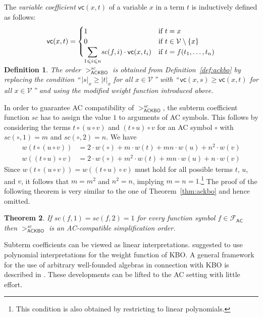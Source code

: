 \documentclass{tlp}
\newcommand{\qed}{\hspace*{1em}\hbox{\proofbox}}
\newtheorem{theorem}{Theorem}[section]
\newtheorem{definition}[theorem]{Definition}
\newcommand{\m}[1]{\mathsf{#1}}
\newcommand{\mc}[1]{\mathcal{#1}}
\newcommand{\mr}[1]{\mathrm{#1}}
\newcommand{\FF}{\mc{F}}
\newcommand{\VV}{\mc{V}}
\newcommand{\AC}{\mr{\m{AC}}}
\newcommand{\scoeff}{\mathit{sc}}
\newcommand{\actkbo}{\mr{\m{ACKBO}}^\scoeff}
\newcommand{\seq}[2][n]{{#2_1},\dots,{#2_{#1}}}
\newcommand{\vcoeff}{\m{vc}}
\begin{document}
\smallskip
\noindent
The \emph{variable coefficient} $\vcoeff(x,t)$ of a variable $x$
in a term $t$ is inductively defined as follows:
\[
\vcoeff(x,t) = \begin{cases}
1 & \text{if $t = x$} \\
0 & \text{if $t \in \VV \setminus \{ x \}$} \\
\displaystyle \smash[b]{\sum_{1 \leqslant i \leqslant n}}
\scoeff(f,i) \cdot \vcoeff(x,t_i) & \text{if $t = f(\seq{t})$}
\end{cases}
\]

\begin{definition}
\label{def:s-ackbo}
The order $>_\actkbo$ is obtained from Definition~\ref{def:ackbo}
by replacing the condition
``\,$|s|_x \geqslant |t|_x$ for all $x \in \VV$\,'' with
``\,$\vcoeff(x,s) \geqslant \vcoeff(x,t)$ for all $x \in \VV$\,''
and using the modified weight function introduced above.
\end{definition}

In order to guarantee AC compatibility of $>_\actkbo$, the
subterm coefficient function $\scoeff$ has to assign the value $1$ to
arguments of AC symbols. This follows by considering the terms
$t \circ (u \circ v)$ and $(t \circ u) \circ v$ for an AC symbol
$\circ$ with $\scoeff({\circ},1) = m$ and $\scoeff({\circ},2) = n$.
We have
\begin{align*}
w(t \circ (u \circ v))
&= 2 \cdot w(\circ) + m \cdot w(t) + mn \cdot w(u) + n^2 \cdot w(v)
\\
w((t \circ u) \circ v)
&= 2 \cdot w(\circ) + m^2 \cdot w(t) + mn \cdot w(u) + n \cdot w(v)
\end{align*}
Since $w(t \circ (u \circ v)) = w((t \circ u) \circ v)$ must hold for
all possible terms
$t$, $u$, and $v$, it follows that $m = m^2$ and $n^2 = n$, implying
$m = n = 1$.\footnote{This condition is also obtained by restricting
\cite[Proposition 4]{BL87} to linear polynomials.}
The proof of the following theorem is very similar to the one of
Theorem~\ref{thm:ackbo} and hence omitted.

\begin{theorem}
If $\scoeff(f,1) = \scoeff(f,2) = 1$ for every function symbol
$f \in \FF_\AC$
then $>_\actkbo$ is an AC-compatible simplification order.
\qed
\end{theorem}

Subterm coefficients can be viewed as linear interpretations.
 suggested to use polynomial interpretations for the weight
function of KBO.
A general framework for the use of arbitrary well-founded algebras in
connection with KBO is described in \cite{MZ97}. These developments
can be lifted to the AC setting with little effort.
\end{document}
